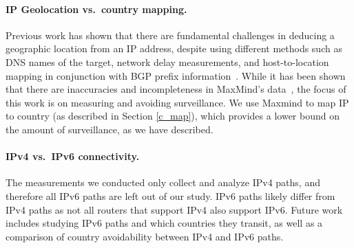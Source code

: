 \paragraph{IP Geolocation vs.\ country mapping.}
Previous work has shown that there are fundamental challenges in
deducing a geographic location from an IP address, despite using
different methods such as DNS names of the target, network delay
measurements, and host-to-location mapping in conjunction with BGP
prefix information~\cite{padmanabhan2001investigation}.  While it has
been shown that there are inaccuracies and incompleteness in MaxMind's
data~\cite{huffaker2011geocompare}, the focus of this work is on
measuring and avoiding surveillance.  We use Maxmind to map
IP to country (as described in Section \ref{c_map}), which provides a lower
bound on the amount of surveillance, as we have described. 

\paragraph{IPv4 vs.\ IPv6 connectivity.}
The measurements we conducted only collect and analyze IPv4 paths, and
therefore all IPv6 paths are left out of our study.  IPv6 paths likely
differ from IPv4 paths as not all routers that support IPv4 also support
IPv6.  Future work includes studying IPv6 paths and which countries they
transit, as well as a comparison of country avoidability between IPv4
and IPv6 paths.  

